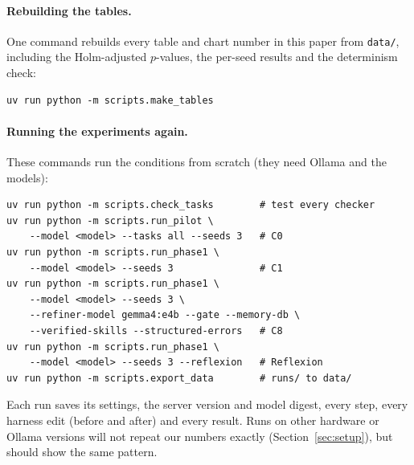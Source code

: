 \paragraph{Rebuilding the tables.}
One command rebuilds every table and chart number in this paper from \texttt{data/}, including the
Holm-adjusted $p$-values, the per-seed results and the determinism check:
\begin{verbatim}
uv run python -m scripts.make_tables
\end{verbatim}

\paragraph{Running the experiments again.}
These commands run the conditions from scratch (they need Ollama and the models):
\begin{verbatim}
uv run python -m scripts.check_tasks        # test every checker
uv run python -m scripts.run_pilot \
    --model <model> --tasks all --seeds 3   # C0
uv run python -m scripts.run_phase1 \
    --model <model> --seeds 3               # C1
uv run python -m scripts.run_phase1 \
    --model <model> --seeds 3 \
    --refiner-model gemma4:e4b --gate --memory-db \
    --verified-skills --structured-errors   # C8
uv run python -m scripts.run_phase1 \
    --model <model> --seeds 3 --reflexion   # Reflexion
uv run python -m scripts.export_data        # runs/ to data/
\end{verbatim}
Each run saves its settings, the server version and model digest, every step, every harness edit
(before and after) and every result. Runs on other hardware or Ollama versions will not repeat our
numbers exactly (Section~\ref{sec:setup}), but should show the same pattern.
